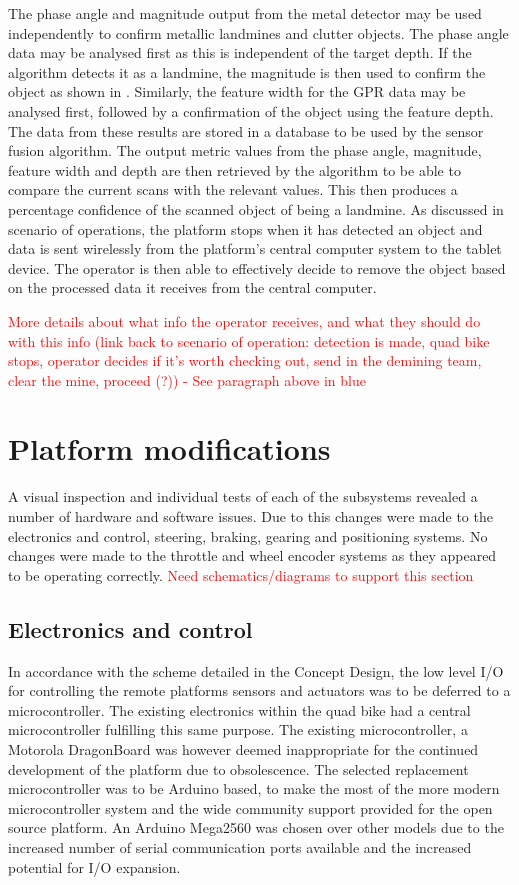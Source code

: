 \documentclass[main.tex]{subfiles}
\begin{document}
The phase angle and magnitude output from the metal detector may be used independently to confirm metallic landmines and clutter objects. The phase angle data may be analysed first as this is independent of the target depth. If the algorithm detects it as a landmine, the magnitude is then used to confirm the object as shown in . Similarly, the feature width for the GPR data may be analysed first, followed by a confirmation of the object using the feature depth. The data from these results are stored in a database to be used by the sensor fusion algorithm. The output metric values from the phase angle, magnitude, feature width and depth are then retrieved by the algorithm to be able to compare the current scans with the relevant values. This then produces a percentage confidence of the scanned object of being a landmine. As discussed in scenario of operations, the platform stops when it has detected an object and data is sent wirelessly from the platform’s central computer system to the tablet device. The operator is then able to effectively decide to remove the object based on the processed data it receives from the central computer.

\textcolor{red}{More details about what info the operator receives, and what they should do with this info (link back to scenario of operation: detection is made, quad bike stops, operator decides if it's worth checking out, send in the demining team, clear the mine, proceed (?)) - See paragraph above in blue}

\section{Platform modifications}
A visual inspection and individual tests of each of the subsystems revealed a number of hardware and software issues. Due to this changes were made to the electronics and control, steering, braking, gearing and positioning systems. No changes were made to the throttle and wheel encoder systems as they appeared to be operating correctly. \textcolor{red}{Need schematics/diagrams to support this section}
\subsection{Electronics and control}
In accordance with the scheme detailed in the Concept Design, the low level I/O for controlling the remote platforms sensors and actuators was to be deferred to a microcontroller. The existing electronics within the quad bike had a central microcontroller fulfilling this same purpose. The existing microcontroller, a Motorola DragonBoard was however deemed inappropriate for the continued development of the platform due to obsolescence. The selected replacement microcontroller was to be Arduino based, to make the most of the more modern microcontroller system and the wide community support provided for the open source platform. An Arduino Mega2560 was chosen over other models due to the increased number of serial communication ports available and the increased potential for I/O expansion. 
\end{document}
